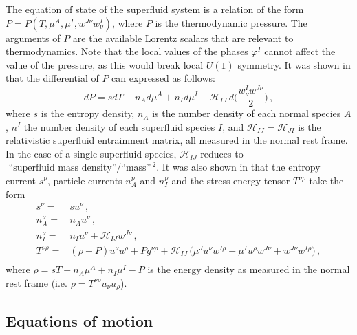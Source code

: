 \documentclass[a4paper, amsfonts, amssymb, amsmath, reprint, showkeys, nofootinbib, twoside,notitlepage,onecolumn]{revtex4-2}
\theoremstyle{definition}
\theoremstyle{theorem}
\theoremstyle{corollary}
\begin{document}
The equation of state of the superfluid system is a relation of the form $P=P(T,\mu^A,\mu^I,w^{J\nu}w^I_\nu)$, where $P$ is the thermodynamic pressure. The arguments of $P$ are the available Lorentz scalars that are relevant to thermodynamics. Note that the local values of the phases $\varphi^I$ cannot affect the value of the pressure, as this would break local $U(1)$ symmetry. It was shown in \cite{GusakovAndersson2006} that the differential of $P$ can expressed as follows:
\begin{equation}\label{DPo}
dP=sdT+ n_A d\mu^A +n_I d\mu^I   - \mathcal{H}_{IJ} \,  d\bigg(\dfrac{w^I_\nu w^{J\nu}}{2} \bigg) \, ,
\end{equation}
where $s$ is the entropy density, $n_A$ is the number density of each normal species $A$, $n^I$ the number density of each superfluid species $I$, and $\mathcal{H}_{IJ}=\mathcal{H}_{JI}$ is the relativistic superfluid entrainment matrix, all measured in the normal rest frame. In the case of a single superfluid species, $\mathcal{H}_{IJ}$ reduces to $\text{ ``superfluid mass density''}/\text{``mass''$\,^2$}$. It was also shown in \cite{GusakovAndersson2006} that the entropy current $s^\nu$, particle currents $n_A^\nu$ and $n_I^\nu$ and the stress-energy tensor $T^{\nu \rho}$ take the form
\begin{equation}\label{gusakko}
\begin{split}
s^\nu ={}& s u^\nu \, , \\
n_A^\nu ={}& n_A u^\nu \, , \\
n_I^\nu ={}& n_I u^\nu +\mathcal{H}_{IJ} w^{J\nu} \, , \\
T^{\nu \rho} ={}& (\rho{+}P) u^\nu u^\rho +P g^{\nu \rho} + \mathcal{H}_{IJ} \, \big( \mu^J  u^\nu w^{I\rho} + \mu^I u^\rho w^{J\nu}+ w^{J\nu} w^{I\rho}\big) \, ,\\
\end{split}
\end{equation}
where $\rho =sT+ n_A \mu^A +n_I \mu^I-P$ is the energy density as measured in the normal rest frame (i.e. $\rho=T^{\nu \rho}u_\nu u_\rho$). 


\subsection{Equations of motion}\label{eom}
\vspace{-0.2cm}
\end{document}
